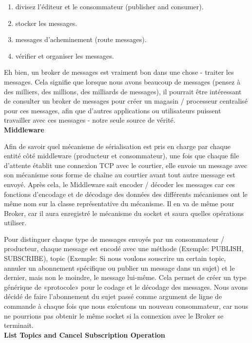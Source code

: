 \begin{enumerate}
	\item divisez l'éditeur et le consommateur (publisher and consumer).
	\item stocker les messages.
	\item messages d'acheminement (route messages).
	\item vérifier et organiser les messages.
\end{enumerate}
Eh bien, un broker de messages est vraiment bon dans une chose - traiter les messages.
Cela signifie que lorsque nous avons beaucoup de messages (pensez à des milliers, des millions, des milliards de messages), il pourrait être intéressant de consulter un broker de messages pour créer un magasin / processeur centralisé pour ces messages, afin que d'autres applications ou utilisateurs puissent travailler avec ces messages - notre seule source de vérité.\\

\textbf{Middleware}

Afin de savoir quel mécanisme de sérialisation est pris en charge par chaque entité côté middleware (producteur et consommateur), une fois que chaque file d'attente établit une connexion TCP avec le courtier, elle envoie un message avec son mécanisme sous forme de chaîne au courtier avant tout autre message est envoyé. Après cela, le Middleware sait encoder / décoder les messages car ces fonctions d'encodage et de décodage des données des différents mécanismes ont le même nom sur la classe représentative du mécanisme. Il en va de même pour Broker, car il aura enregistré le mécanisme du socket et saura quelles opérations utiliser.

Pour distinguer chaque type de messages envoyés par un consommateur / producteur, chaque message est encodé avec une méthode (Exemple: PUBLISH, SUBSCRIBE), topic (Exemple: Si nous voulons souscrire un certain topic, annuler un abonnement spécifique ou publier un message dans un sujet) et le dernier, mais non le moindre, le message lui-même. Cela permet de créer un type générique de «protocole» pour le codage et le décodage des messages. Nous avons décidé de faire l'abonnement du sujet passé comme argument de ligne de commande à chaque fois que nous exécutons un nouveau consommateur, car nous ne pourrions pas obtenir le même socket si la connexion avec le Broker se terminait.\\

\textbf{List Topics and Cancel Subscription Operation}

